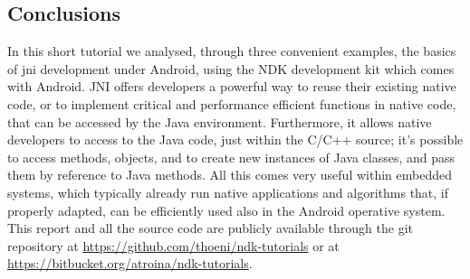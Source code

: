 \documentclass[a4paper,10pt]{article}
\begin{document}
\begin{multicols}{2}
\section{Conclusions}
In this short tutorial we analysed, through three convenient examples, the
basics of jni development under Android, using the NDK development kit which
comes with Android. JNI offers developers a powerful way to reuse their existing
native code, or to implement critical and performance efficient functions in
native code, that can be accessed by the Java environment. Furthermore, it
allows native developers to access to the Java code, just within the C/C++
source; it's possible to access methods, objects, and to create new instances of
Java classes, and pass them by reference to Java methods. All this comes very
useful within embedded systems, which typically already run native applications
and algorithms that, if properly adapted, can be efficiently used also in the
Android operative system.\\
This report and all the source code are publicly available through the git
repository at \url{https://github.com/thoeni/ndk-tutorials} or at
\url{https://bitbucket.org/atroina/ndk-tutorials}.

\nocite{liang1999jni}
\nocite{marakanajni}
\nocite{learningandroid}
\nocite{programmingandroid}




\end{multicols}
\end{document}
